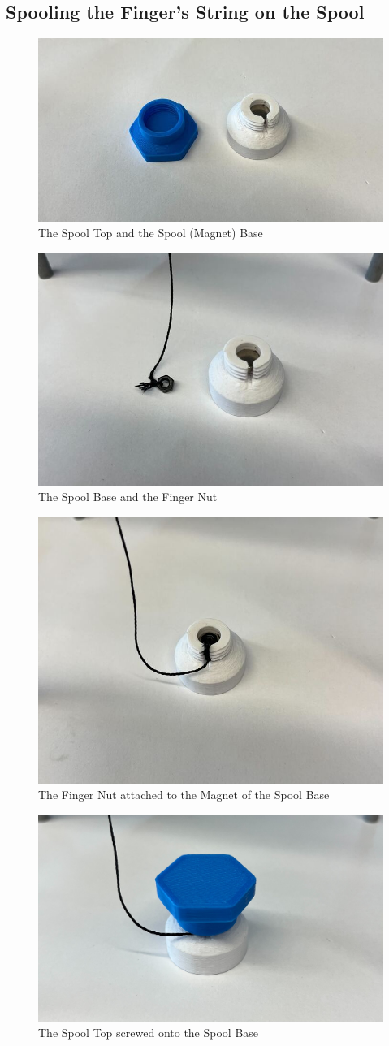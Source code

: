 \documentclass{article}
\begin{document}
\subsection{Spooling the Finger's String on the Spool}
\begin{figure}[H]
    \centering
    \includegraphics[width=0.5\linewidth]{PCBImages/Spools/spools_1.jpg}
    \caption{The Spool Top and the Spool (Magnet) Base}
    \label{fig:spool_top_and_base}
\end{figure}
\begin{figure}[H]
    \centering
    \includegraphics[width=0.5\linewidth]{PCBImages/Spools/spools_2.jpg}
    \caption{The Spool Base and the Finger Nut}
    \label{fig:spool_base_and_finger_nut}
\end{figure}
\begin{figure}[H]
    \centering
    \includegraphics[width=0.5\linewidth]{PCBImages/Spools/spools_3.jpg}
    \caption{The Finger Nut attached to the Magnet of the Spool Base}
    \label{fig:finger_nut_attached}
\end{figure}
\begin{figure}[H]
    \centering
    \includegraphics[width=0.5\linewidth]{PCBImages/Spools/spools_4.jpg}
    \caption{The Spool Top screwed onto the Spool Base}
    \label{fig:spool_top_screwed}
\end{figure}
\end{document}

